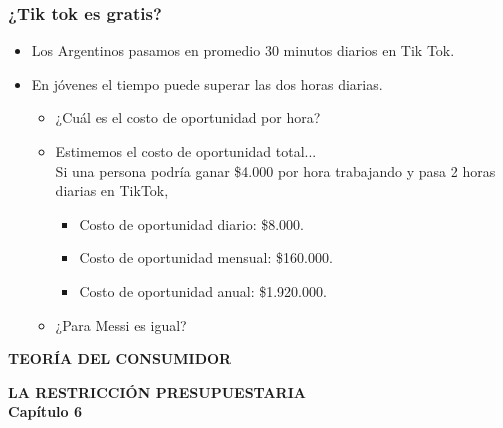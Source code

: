 \documentclass{beamer}
\begin{document}
\begin{frame}
\frametitle{¿Tik tok es gratis?}
\begin{itemize}
    \item Los Argentinos pasamos en promedio 30 minutos diarios en Tik Tok. \vspace{2mm}
    \item En jóvenes el tiempo puede superar las dos horas diarias. \vspace{2mm}
    \begin{itemize}
    \item ¿Cuál es el costo de oportunidad por hora? \vspace{2mm}
    \item Estimemos el costo de oportunidad total... \\ \pause \vspace{2mm}
    Si una persona podría ganar \$4.000 por hora trabajando y pasa 2 horas diarias en TikTok, \vspace{2mm} \pause 
    \begin{itemize}
	 \item Costo de oportunidad diario: \$8.000. 
	 \item Costo de oportunidad mensual: \$160.000. 
	 \item Costo de oportunidad anual: \$1.920.000. 
    \end{itemize}
    \vspace{2mm} \pause 
    \item ¿Para Messi es igual?
    \end{itemize}
\end{itemize} 
\end{frame}

\begin{frame}
    \centering
    \begin{boxB}
    \centering \Large \textbf{TEORÍA DEL CONSUMIDOR} \\   
    \end{boxB}
     \vspace{2mm}
    \Large \textbf{LA RESTRICCIÓN PRESUPUESTARIA} \\
     \vspace{2mm}
    \large \textbf{Capítulo 6}
\end{frame}
\end{document}
